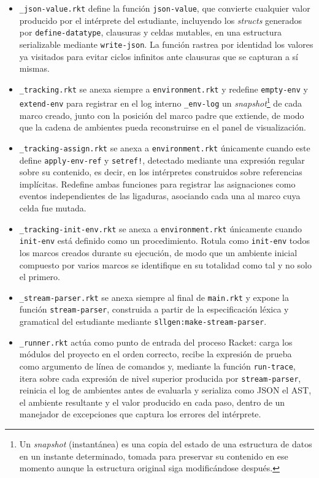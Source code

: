 \begin{itemize}
  \item \texttt{\_json-value.rkt} define la función \texttt{json-value}, que convierte cualquier valor producido por el intérprete del estudiante, incluyendo los \textit{structs} generados por \texttt{define-datatype}, clausuras y celdas mutables, en una estructura serializable mediante \texttt{write-json}. La función rastrea por identidad los valores ya visitados para evitar ciclos infinitos ante clausuras que se capturan a sí mismas.

  \item \texttt{\_tracking.rkt} se anexa siempre a \texttt{environment.rkt} y redefine \texttt{empty-env} y \texttt{extend-env} para registrar en el log interno \texttt{\_env-log} un \textit{snapshot}\footnote{Un \textit{snapshot} (instantánea) es una copia del estado de una estructura de datos en un instante determinado, tomada para preservar su contenido en ese momento aunque la estructura original siga modificándose después.} de cada marco creado, junto con la posición del marco padre que extiende, de modo que la cadena de ambientes pueda reconstruirse en el panel de visualización.

  \item \texttt{\_tracking-assign.rkt} se anexa a \texttt{environment.rkt} únicamente cuando este define \texttt{apply-\allowbreak env-\allowbreak ref} y \texttt{setref!}, detectado mediante una expresión regular sobre su contenido, es decir, en los intérpretes construidos sobre referencias implícitas. Redefine ambas funciones para registrar las asignaciones como eventos independientes de las ligaduras, asociando cada una al marco cuya celda fue mutada.

  \item \texttt{\_tracking-init-env.rkt} se anexa a \texttt{environment.rkt} únicamente cuando \texttt{init-env} está definido como un procedimiento. Rotula como \texttt{init-env} todos los marcos creados durante su ejecución, de modo que un ambiente inicial compuesto por varios marcos se identifique en su totalidad como tal y no solo el primero.

  \item \texttt{\_stream-parser.rkt} se anexa siempre al final de \texttt{main.rkt} y expone la función \texttt{stream-parser}, construida a partir de la especificación léxica y gramatical del estudiante mediante \texttt{sllgen:\allowbreak make-stream-parser}.

  \item \texttt{\_runner.rkt} actúa como punto de entrada del proceso Racket: carga los módulos del proyecto en el orden correcto, recibe la expresión de prueba como argumento de línea de comandos y, mediante la función \texttt{run-trace}, itera sobre cada expresión de nivel superior producida por \texttt{stream-parser}, reinicia el log de ambientes antes de evaluarla y serializa como JSON el AST, el ambiente resultante y el valor producido en cada paso, dentro de un manejador de excepciones que captura los errores del intérprete.
\end{itemize}

